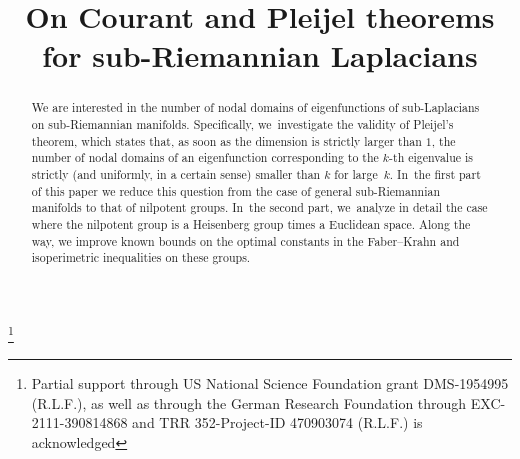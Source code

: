 \documentclass[JEP,XML,SOM,Unicode,published]{cedram}
\theoremstyle{definition}
\newcommand{\1}{\mathbbm{1}}
\begin{document}
\frontmatter
\title[Pleijel theorem for sub-Laplacians]{On Courant and Pleijel theorems for sub-Riemannian Laplacians}

\author[\initial{R.} \middlename{L.} \lastname{Frank}]{  }
\address{Mathematisches Institut, Ludwig-Maximilians Universität München,\\
Theresienstr.~39, 80333 München, Germany}
\address{\& Munich Center for Quantum Science and Technology,\\
Schellingstr.~4, 80799 München, Germany}
\address{\& Mathematics 253-37, Caltech,\\
Pasadena, CA 91125, USA}

\author[\initial{B.} \lastname{Helffer}]{ }
\address{Laboratoire de Mathématiques Jean Leray, CNRS, Nantes Université,\\
F44000. Nantes, France}

\thanks{Partial support through US National Science Foundation grant DMS-1954995 (R.L.F.), as well as through the German Research Foundation through EXC-2111-390814868 and TRR 352-Project-ID 470903074 (R.L.F.) is acknowledged}

\begin{abstract}
We are interested in the number of nodal domains of eigenfunctions of sub-Laplacians on sub-Riemannian manifolds. Specifically, we~investigate the validity of Pleijel's theorem, which states that, as soon as the dimension is strictly larger than $1$, the number of nodal domains of an eigenfunction corresponding to the $k$-th eigenvalue is strictly (and uniformly, in a certain sense) smaller than $k$ for large~$k$. In~the first part of this paper we reduce this question from the case of general sub-Riemannian manifolds to that of nilpotent groups. In~the second part, we~analyze in detail the case where the nilpotent group is a Heisenberg group times a Euclidean space. Along the way, we improve known bounds on the optimal constants in the Faber--Krahn and isoperimetric inequalities on these groups.
\end{abstract}


\end{document}
